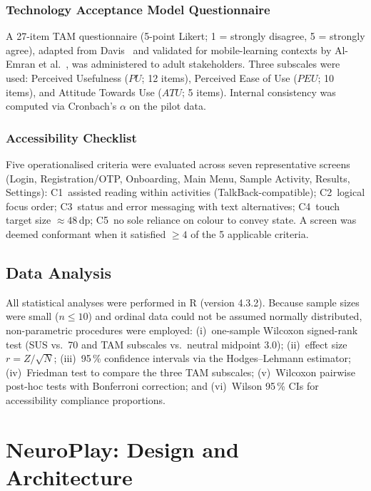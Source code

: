 \documentclass[preprint,12pt]{elsarticle}
\begin{document}
            \subsubsection{Technology Acceptance Model Questionnaire}
                A 27-item TAM questionnaire (5-point Likert; 1 = strongly disagree, 5 = strongly agree), adapted from Davis~\cite{Davis1989} and validated for mobile-learning contexts by Al-Emran et al.~\cite{AlEmran2018}, was administered to adult stakeholders. Three subscales were used: Perceived Usefulness ($\mathit{PU}$; 12 items), Perceived Ease of Use ($\mathit{PEU}$; 10 items), and Attitude Towards Use ($\mathit{ATU}$; 5 items). Internal consistency was computed via Cronbach's $\alpha$ on the pilot data.
            
            \subsubsection{Accessibility Checklist}
                Five operationalised criteria were evaluated across seven representative screens (Login, Registration/OTP, Onboarding, Main Menu, Sample Activity, Results, Settings): C1~assisted reading within activities (TalkBack-compatible); C2~logical focus order; C3~status and error messaging with text alternatives; C4~touch target size $\approx 48$\,dp; C5~no sole reliance on colour to convey state. A screen was deemed conformant when it satisfied $\geq 4$ of the 5 applicable criteria.
                
        \subsection{Data Analysis}
        \label{subsec:analysis}
            All statistical analyses were performed in R (version 4.3.2). Because sample sizes were small ($n \leq 10$) and ordinal data could not be assumed normally distributed, non-parametric procedures were employed: (i)~one-sample Wilcoxon signed-rank test (SUS vs.\ 70 and TAM subscales vs.\ neutral midpoint 3.0); (ii)~effect size $r = Z / \sqrt{N}$; (iii)~95\,\% confidence intervals via the Hodges--Lehmann estimator; (iv)~Friedman test to compare the three TAM subscales; (v)~Wilcoxon pairwise post-hoc tests with Bonferroni correction; and (vi)~Wilson 95\,\% CIs for accessibility compliance proportions.
    \section{NeuroPlay: Design and Architecture}
    \label{sec:design}
\end{document}
